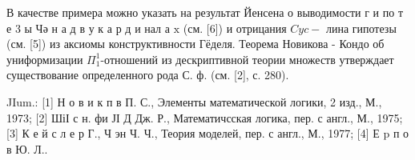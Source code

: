 \documentclass[10pt]{article}
\begin{document}
В качестве примера можно указать на результат Йенсена о выводимости г и по т е 3 ы Чә н а д в у $\mathbf{к}$ а р д и нал а $\mathrm{x}$ (см. [6]) и отрицания $C y c-$ лина гипотезы (см. [5]) из аксиомы конструктивности Гёделя. Теорема Новикова - Кондо об униформизации $\Pi_{1}^{1}$-отношений из дескриптивной теории множеств утверждает существование определенного рода С. ф. (см. [2], с. 280).



JIum.: [1] Н о в и к п в П. С., Элементы математической логики, 2 изд., М., 1973; [2] ШіІ с н. фи ЈІ Д Дж. Р., Математичсская логика, пер. с англ., М., 1975; [3] К е й с л е р Г., Ч эн Ч. Ч., Теория моделей, пер. с англ., М., 1977; [4] Е p п о в Ю. Л..
\end{document}
